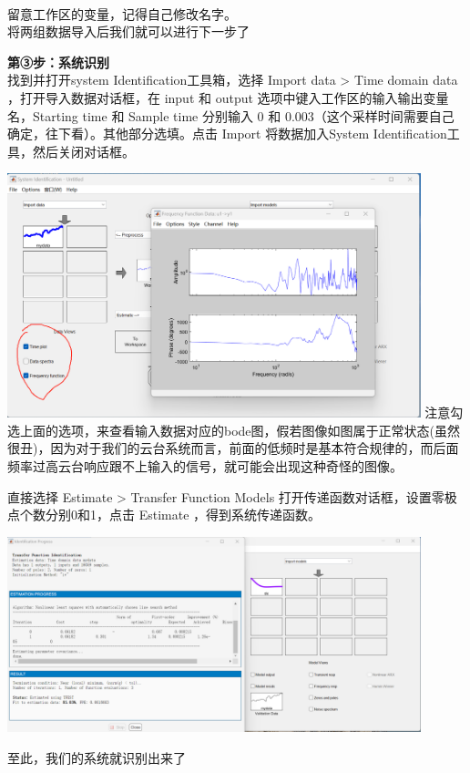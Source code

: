 \documentclass[UTF8,a4paper,12pt]{ctexart}
\begin{document}
\begin{flushleft}
\begin{flushleft}
        \\留意工作区的变量，记得自己修改名字。
        \\将两组数据导入后我们就可以进行下一步了
      \end{flushleft}
      \begin{flushleft}
        \textbf{第③步：系统识别}\\
        找到并打开system Identification工具箱，选择 Import data > Time domain data ，打开导入数据对话框，在 input 和 output 选项中键入工作区的输入输出变量名，Starting time 和 Sample time 分别输入 0 和 0.003（这个采样时间需要自己确定，往下看）。其他部分选填。点击 Import 将数据加入System Identification工具，然后关闭对话框。
      \end{flushleft}
      \begin{flushleft}
        
        \par \includegraphics[width=12cm]{picture/bode.png}
        注意勾选上面的选项，来查看输入数据对应的bode图，假若图像如图属于正常状态(虽然很丑)，因为对于我们的云台系统而言，前面的低频时是基本符合规律的，而后面频率过高云台响应跟不上输入的信号，就可能会出现这种奇怪的图像。
      \end{flushleft}
      \begin{flushleft}
        直接选择 Estimate > Transfer Function Models 打开传递函数对话框，设置零极点个数分别0和1，点击 Estimate ，得到系统传递函数。
        \par \includegraphics[width=12cm]{picture/identify_result.png}
      \end{flushleft}
      至此，我们的系统就识别出来了
    \end{flushleft}
\end{document}
